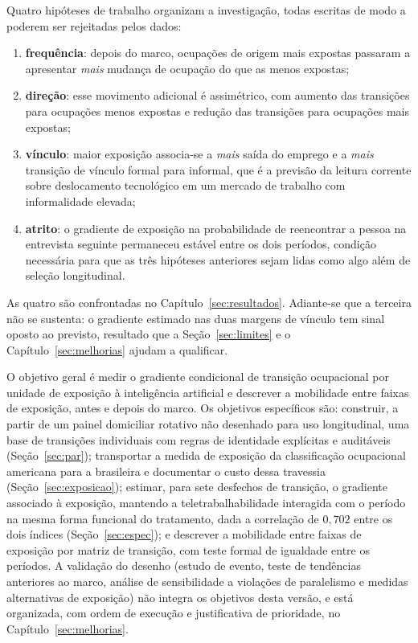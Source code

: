 Quatro hipóteses de trabalho organizam a investigação, todas escritas de modo a
poderem ser rejeitadas pelos dados:

\begin{enumerate}[label=\alph*)]
  \item \textbf{frequência}: depois do marco, ocupações de origem mais expostas
        passaram a apresentar \emph{mais} mudança de ocupação do que as menos
        expostas;
  \item \textbf{direção}: esse movimento adicional é assimétrico, com aumento
        das transições para ocupações menos expostas e redução das transições
        para ocupações mais expostas;
  \item \textbf{vínculo}: maior exposição associa-se a \emph{mais} saída do
        emprego e a \emph{mais} transição de vínculo formal para informal, que é
        a previsão da leitura corrente sobre deslocamento tecnológico em um
        mercado de trabalho com informalidade elevada;
  \item \textbf{atrito}: o gradiente de exposição na probabilidade de reencontrar
        a pessoa na entrevista seguinte permaneceu estável entre os dois
        períodos, condição necessária para que as três hipóteses anteriores
        sejam lidas como algo além de seleção longitudinal.
\end{enumerate}

As quatro são confrontadas no Capítulo~\ref{sec:resultados}. Adiante-se que a
terceira não se sustenta: o gradiente estimado nas duas margens de vínculo tem
sinal oposto ao previsto, resultado que a Seção~\ref{sec:limites} e o
Capítulo~\ref{sec:melhorias} ajudam a qualificar.

O objetivo geral é medir o gradiente condicional de transição ocupacional por
unidade de exposição à inteligência artificial e descrever a mobilidade entre
faixas de exposição, antes e depois do marco. Os objetivos específicos são:
construir, a partir de um painel domiciliar rotativo não desenhado para uso
longitudinal, uma base de transições individuais com regras de identidade
explícitas e auditáveis (Seção~\ref{sec:par}); transportar a medida de exposição
da classificação ocupacional americana para a brasileira e documentar o custo
dessa travessia (Seção~\ref{sec:exposicao}); estimar, para sete desfechos de
transição, o gradiente associado à exposição, mantendo a teletrabalhabilidade
interagida com o período na mesma forma funcional do tratamento, dada a
correlação de $0{,}702$ entre os dois índices (Seção~\ref{sec:espec}); e
descrever a mobilidade entre faixas de exposição por matriz de transição, com
teste formal de igualdade entre os períodos. A validação do desenho (estudo de
evento, teste de tendências anteriores ao marco, análise de sensibilidade a
violações de paralelismo e medidas alternativas de exposição) não integra os
objetivos desta versão, e está organizada, com ordem de execução e justificativa
de prioridade, no Capítulo~\ref{sec:melhorias}.

